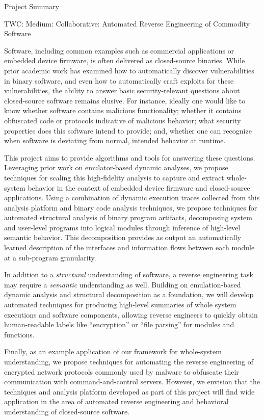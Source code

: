 \documentclass[letterpaper,twoside,11pt,headings=small]{scrartcl}
\newcommand{\basetitle}{TWC: Medium: Collaborative: Automated Reverse Engineering of Commodity Software}
\newcommand{\thetitle}{\basetitle\xspace}
\begin{document}

{\sffamily\bfseries
\begin{center}
\fontsize{16}{16}\selectfont Project Summary

\fontsize{13}{13}\selectfont \thetitle
\end{center}
\label{sec:summary}
}

Software, including common examples such as commercial applications or
embedded device firmware, is often delivered as closed-source binaries.  While
prior academic work has examined how to automatically discover vulnerabilities
in binary software, and even how to automatically craft exploits for these
vulnerabilities, the ability to answer basic security-relevant questions about
closed-source software remains elusive.  For instance, ideally one would like
to know whether software contains malicious functionality; whether it contains
obfuscated code or protocols indicative of malicious behavior; what security
properties does this software intend to provide; and, whether one can
recognize when software is deviating from normal, intended behavior at
runtime.

This project aims to provide algorithms and tools for answering these
questions. Leveraging prior work on emulator-based dynamic analyses, we
propose techniques for scaling this high-fidelity analysis to capture and
extract whole-system behavior in the context of embedded device firmware and
closed-source applications.  Using a combination of dynamic execution traces
collected from this analysis platform and binary code analysis techniques, we
propose techniques for automated structural analysis of binary program
artifacts, decomposing system and user-level programs into logical modules
through inference of high-level semantic behavior.  This decomposition
provides as output an automatically learned description of the interfaces and
information flows between each module at a sub-program granularity.

In addition to a \emph{structural} understanding of software, a reverse
engineering task may require a \emph{semantic} understanding as well. Building
on emulation-based dynamic analysis and structural decomposition as a
foundation, we will develop automated techniques for producing high-level
summaries of whole system executions and software components, allowing reverse
engineers to quickly obtain human-readable labels like ``encryption'' or ``file
parsing'' for modules and functions.

Finally, as an example application of our framework for whole-system
understanding, we propose techniques for automating the reverse engineering of
encrypted network protocols commonly used by malware to obfuscate their
communication with command-and-control servers.  However, we envision that the
techniques and analysis platform developed as part of this project will find
wide application in the area of automated reverse engineering and behavioral
understanding of closed-source software.
\end{document}
